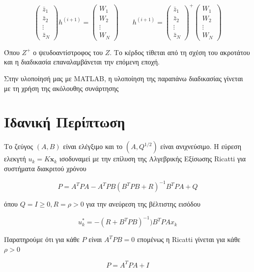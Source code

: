 \documentclass[a4paper,oneside,12pt]{article}
\renewcommand{\vec}[1]{\ensuremath{\mathbf {  #1 }}}
\begin{document}
\begin{equation}
	\begin{pmatrix}
		\bar z_1 \\ \bar z_2 \\ \vdots  \\ \bar z_N
	\end{pmatrix}
	h^{(i+1)} = 
	\begin{pmatrix}
		W_1 \\ W_2 \\ \vdots \\ W_N
	\end{pmatrix} \qquad
	h^{(i+1)} = 
		\begin{pmatrix}
		\bar z_1 \\ \bar z_2 \\ \vdots  \\ \bar z_N
	\end{pmatrix}^+
	\begin{pmatrix}
		W_1 \\ W_2 \\ \vdots \\ W_N
	\end{pmatrix}
\end{equation} 

Όπου $Z^+$ ο ψευδοαντίστροφος του $Z$. Το κέρδος τίθεται από τη σχέση του ακροτάτου και η διαδικασία επαναλαμβάνεται την επόμενη εποχή.

Στην υλοποίησή μας με MATLAB, η υλοποίηση της παραπάνω διαδικασίας γίνεται με τη χρήση της ακόλουθης συνάρτησης




\section{Ιδανική Περίπτωση} 

Το ζεύγος $(A, B)$ είναι ελέγξιμο και το $(A, Q^{1/2})$ είναι ανιχνεύσιμο. Η εύρεση ελεκγτή $u_k = K \vec x_k$ ισοδυναμεί με την επίλυση της Αλγεβρικής Εξίσωσης Ricatti για συστήματα διακριτού χρόνου

$$P = A^T P A - A^T P B (B^T P B + R)^{-1} B^T P A + Q$$

όπου $Q = I \ge 0, R = \rho > 0$ για την ανεύρεση της βέλτιστης εισόδου 

$$u^*_k = - (R + B^TPB)^{-1})B^T P A x_k$$

Παρατηρούμε ότι για κάθε $P$ είναι $A^TPB = 0$ επομένως η Ricatti γίνεται για κάθε $\rho > 0$

$$P = A^TPA + I$$ 
\end{document}
